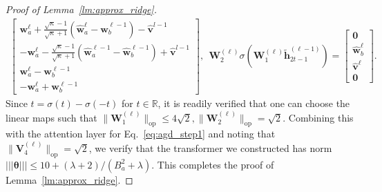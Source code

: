 \documentclass[10pt]{article}
\renewcommand{\hat}{\widehat}
\newcommand{\lops}[1]{\|{#1}\|_{\mathrm{op}}}
\newcommand{\<}{\left\langle}
\renewcommand{\>}{\right\rangle}
\newcommand{\lth}{{(\ell)}}
\newcommand{\bzero}{{\mathbf 0}}
\newcommand{\nrmp}[1]{{\left|\!\left|\!\left|{#1}\right|\!\right|\!\right|}}
\newcommand{\R}{\mathbb{R}}
\def\bV{{\mathbf V}}
\def\bW{{\mathbf W}}
\def\btheta{{\boldsymbol \theta}}
\def\bh{{\mathbf h}}
\def\bv{{\mathbf v}}
\def\bw{{\mathbf w}}
\begin{document}
\begin{proof}[Proof of Lemma~\ref{lm:approx_ridge}]
\begin{align*}
\begin{bmatrix}
        \bw^{\ell}_a+\frac{\sqrt{\kappa}-1}{\sqrt{\kappa}+1}(\hat\bw^{\ell}_a-\hat\bw^{\ell-1}_b)-\hat\bv^{l-1}
        \\
        -\bw^{\ell}_a-\frac{\sqrt{\kappa}-1}{\sqrt{\kappa}+1}(\hat\bw^{\ell-1}_a-\hat\bw^{\ell-1}_b)+\hat\bv^{l-1}
        \\
        \bw^{\ell}_a- \bw^{\ell-1}_b
        \\
        -\bw^{\ell}_a+\bw^{\ell-1}_b
    \end{bmatrix},~~ \bW_2^{(\ell)}\sigma(\bW_1^{(\ell)}\tilde\bh^{(\ell-1)}_{2t-1})=\begin{bmatrix}
      \bzero\\  \hat\bw^{\ell}_b \\ \hat\bv^\ell\\\bzero
    \end{bmatrix}.
\end{align*} Since $t=\sigma(t)-\sigma(-t)$ for $t\in\R$,  it is readily verified that one can choose the linear maps such that $\lops{\bW_1^\lth}\leq 4\sqrt{2},\lops{\bW_2^\lth}=\sqrt{2}$. Combining this with the attention layer for Eq.~\eqref{eq:agd_step1} and noting that $\lops{\bV_4^\lth}=\sqrt{2}$, we verify that the  transformer we constructed has norm $\nrmp{\btheta}\leq 10+(\lambda+2)/(B_a^2+\lambda)$. This completes the proof of Lemma~\ref{lm:approx_ridge}.
\end{proof}
\end{document}
